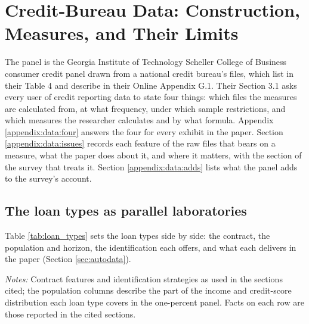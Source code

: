 \section{Credit-Bureau Data: Construction, Measures, and Their Limits}\label{appendix:data}

The panel is the Georgia Institute of Technology Scheller College of Business consumer credit panel drawn from a national credit bureau's files, which \citet{gibbs_consumer_2025} list in their Table 4 and describe in their Online Appendix G.1. Their Section 3.1 asks every user of credit reporting data to state four things: which files the measures are calculated from, at what frequency, under which sample restrictions, and which measures the researcher calculates and by what formula. Appendix \ref{appendix:data:four} answers the four for every exhibit in the paper. Section \ref{appendix:data:issues} records each feature of the raw files that bears on a measure, what the paper does about it, and where it matters, with the section of the survey that treats it. Section \ref{appendix:data:adds} lists what the panel adds to the survey's account.

\subsection{The loan types as parallel laboratories}\label{appendix:data:loantypes}

Table \ref{tab:loan_types} sets the loan types side by side: the contract, the population and horizon, the identification each offers, and what each delivers in the paper (Section \ref{sec:autodata}).

\begin{landscape}
\begin{table}[H]
\centering
\caption{The loan types as parallel laboratories}
\label{tab:loan_types}
\scriptsize

\vspace{0.5em}
\begin{minipage}{0.92\textwidth}
\noindent \small \textit{Notes:} Contract features and identification strategies as used in the sections cited; the population columns describe the part of the income and credit-score distribution each loan type covers in the one-percent panel. Facts on each row are those reported in the cited sections.
\end{minipage}
\end{table}
\end{landscape}

